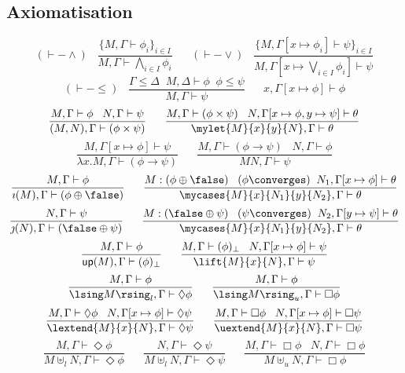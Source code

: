 \subsection*{Axiomatisation}
\[ ({\vdash}-{\wedge}) \;\;\; \frac{ \{ M, \Gamma \vdash \phi_{i} \}_{i \in I}}{M, \Gamma \vdash \bigwedge_{i \in I} \phi_{i}} \;\;\;\;\;\;
   ({\vdash}-{\vee}) \;\;\; \frac{ \{ M, \Gamma [x \mapsto \phi_{i}] \vdash \psi \}_{i \in I}}{M, \Gamma [x \mapsto \bigvee_{i \in I}\phi_{i}] \vdash \psi} \]
\[ ({\vdash}-{\leq}) \;\;\; \frac{\Gamma \leq \Delta \;\; M, \Delta \vdash \phi \;\; \phi \leq \psi}{M, \Gamma \vdash \psi} \;\;\;\;\;\;
   x, \Gamma [x \mapsto \phi ] \vdash \phi \] 
\[ \frac{M, \Gamma \vdash \phi \;\;\; N, \Gamma \vdash \psi}{(M, N), \Gamma \vdash (\phi \times \psi )} \;\;\;\;\;\;
   \frac{M, \Gamma \vdash (\phi \times \psi ) \;\;\; N, \Gamma [x \mapsto \phi , y \mapsto \psi ] \vdash \theta}{\mylet{M}{x}{y}{N} , \Gamma \vdash \theta} \]
\[\frac{M, \Gamma [x \mapsto \phi ] \vdash \psi}{\lambda x.M, \Gamma
\vdash (\phi \rightarrow \psi )} \;\;\;\;\;\; 
  \frac{M, \Gamma \vdash (\phi
\rightarrow \psi ) \;\;\; N, \Gamma \vdash \phi}{MN, \Gamma \vdash \psi} \]
\[ \frac{M, \Gamma \vdash \phi}{\imath (M), \Gamma \vdash (\phi \oplus \false )}
\;\;\;\;\;\;
   \frac{M : (\phi \oplus \false ) \;\;\; (\phi \converges ) \;\;
N_{1}, \Gamma [x \mapsto \phi ] \vdash \theta}{\mycases{M}{x}{N_{1}}{y}{N_{2}}, \Gamma \vdash \theta} \]
\[ \frac{N, \Gamma \vdash \psi}{\jmath (N), \Gamma \vdash (\false \oplus \psi )}
\;\;\;\;\;\;
   \frac{M : (\false \oplus \psi ) \;\;\; (\psi \converges ) \;\;
N_{2}, \Gamma [y \mapsto \psi ] \vdash \theta}{\mycases{M}{x}{N_{1}}{y}{N_{2}}, \Gamma \vdash \theta} \]
\[ \frac{M, \Gamma \vdash \phi}{{\sf up}(M), \Gamma \vdash (\phi )_{\bot}} \;\;\;\;\;\;
   \frac{M, \Gamma \vdash (\phi )_{\bot} \;\;\; N, \Gamma [x \mapsto \phi ] \vdash \psi}{\lift{M}{x}{N}, \Gamma \vdash \psi} \]
\[\frac{M, \Gamma \vdash \phi}{\lsing M \rsing_{l}, \Gamma \vdash \Diamond
\phi} \;\;\;\;\;\;
  \frac{M, \Gamma \vdash \phi}{\lsing M \rsing_{u}, \Gamma \vdash \Box \phi} \]
\[ \frac{M, \Gamma \vdash \Diamond \phi \;\;\; N, \Gamma [x \mapsto \phi ] \vdash \Diamond \psi}{\lextend{M}{x}{N}, \Gamma \vdash \Diamond \psi} 
\;\;\;\;\;\;
   \frac{M, \Gamma \vdash \Box \phi \;\;\; N, \Gamma [x \mapsto \phi ] \vdash
\Box \psi}{\uextend{M}{x}{N}, \Gamma \vdash \Box \psi} \]
\[ \frac{M, \Gamma \vdash \Diamond \phi}{M \uplus_{l} N, \Gamma \vdash \Diamond \phi} \;\;\;\;\;\;
   \frac{N, \Gamma \vdash \Diamond \psi}{M \uplus_{l} N, \Gamma \vdash \Diamond \psi} \;\;\;\;\;\;
   \frac{M, \Gamma \vdash \Box \phi \;\;\; N, \Gamma \vdash \Box \phi}{M
\uplus_{u} N, \Gamma \vdash \Box \phi} \]

